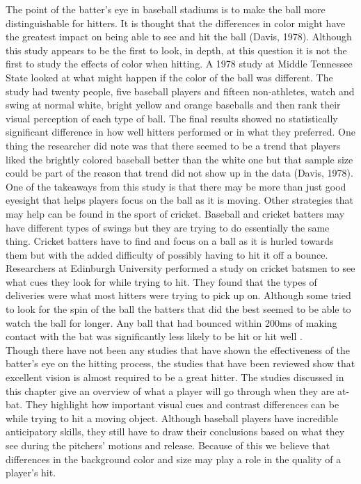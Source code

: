 \documentclass{article}
\begin{document}
\begin{doublespace}
The point of the batter’s eye in baseball stadiums is to make the ball more distinguishable for hitters. It is thought that the differences in color might have the greatest impact on being able to see and hit the ball (Davis, 1978). Although this study appears to be the first to look, in depth, at this question it is not the first to study the effects of color when hitting. A 1978 study at Middle Tennessee State looked at what might happen if the color of the ball was different. The study had twenty people, five baseball players and fifteen non-athletes, watch and swing at normal white, bright yellow and orange baseballs and then rank their visual perception of each type of ball. The final results showed no statistically significant difference in how well hitters performed or in what they preferred. One thing the researcher did note was that there seemed to be a trend that players liked the brightly colored baseball better than the white one but that sample size could be part of the reason that trend did not show up in the data (Davis, 1978). One of the takeaways from this study is that there may be more than just good eyesight that helps players focus on the ball as it is moving. Other strategies that may help can be found in the sport of cricket. Baseball and cricket batters may have different types of swings but they are trying to do essentially the same thing. Cricket batters have to find and focus on a ball as it is hurled towards them but with the added difficulty of possibly having to hit it off a bounce. Researchers at Edinburgh University performed a study on cricket batsmen to see what cues they look for while trying to hit. They found that the types of deliveries were what most hitters were trying to pick up on. Although some tried to look for the spin of the ball the batters that did the best seemed to be able to watch the ball for longer. Any ball that had bounced within 200ms of making contact with the bat was significantly less likely to be hit or hit well \citep{Renshaw}.
\\
Though there have not been any studies that have shown the effectiveness of the batter’s eye on the hitting process, the studies that have been reviewed show that excellent vision is almost required to be a great hitter. The studies discussed in this chapter give an overview of what a player will go through when they are at-bat. They highlight how important visual cues and contrast differences can be while trying to hit a moving object. Although baseball players have incredible anticipatory skills, they still have to draw their conclusions based on what they see during the pitchers’ motions and release. Because of this we believe that differences in the background color and size may play a role in the quality of a player’s hit.
\pagebreak

\end{doublespace}
\end{document}
